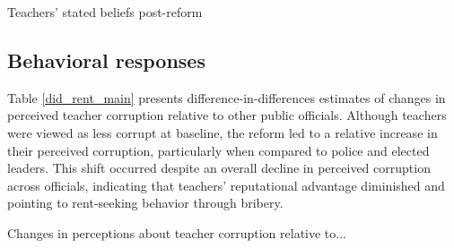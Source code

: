 \documentclass[hidelinks,12pt]{article}
\begin{document}
\begin{singlespace}
\begingroup
\setlength{\tabcolsep}{14pt}  %
\begin{table}[H]
   \begin{singlespace}
    \centering
    \fontsize{11pt}{10pt}\selectfont  %
    \caption{Teachers' stated beliefs post-reform} \label{did_beliefs_main}
    \end{singlespace}
\end{table}
\endgroup

\subsection{Behavioral responses}
Table \ref{did_rent_main} presents difference-in-differences estimates of changes in perceived teacher corruption relative to other public officials. Although teachers were viewed as less corrupt at baseline, the reform led to a relative increase in their perceived corruption, particularly when compared to police and elected leaders. This shift occurred despite an overall decline in perceived corruption across officials, indicating that teachers’ reputational advantage diminished and pointing to rent-seeking behavior through bribery.

\begingroup
\setlength{\tabcolsep}{18pt}  %
\begin{table}[h]
   \begin{singlespace}
    \centering
    \fontsize{11pt}{10pt}\selectfont  %
    \caption{Changes in perceptions about teacher corruption relative to...} \label{did_rent_main}
    \end{singlespace}
\end{table}
\endgroup


\end{singlespace}
\end{document}
